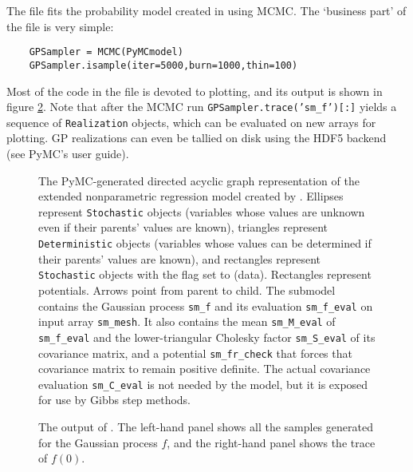The file  fits the probability model created in  using MCMC. The `business part' of the file is very simple:
\begin{verbatim}
    GPSampler = MCMC(PyMCmodel)
    GPSampler.isample(iter=5000,burn=1000,thin=100)
\end{verbatim}
Most of the code in the file is devoted to plotting, and its output is shown in figure \ref{fig:MCMCOutput}. Note that after the MCMC run \texttt{GPSampler.trace('sm_f')[:]} yields a sequence of \texttt{Realization} objects, which can be evaluated on new arrays for plotting. GP realizations can even be tallied on disk using the HDF5 backend (see PyMC's user guide).

\begin{figure}
    \centering
    \caption{The PyMC-generated directed acyclic graph representation of the extended nonparametric regression model created by . Ellipses represent \texttt{Stochastic} objects (variables whose values are unknown even if their parents' values are known), triangles represent \texttt{Deterministic} objects (variables whose values can be determined if their parents' values are known), and rectangles represent \texttt{Stochastic} objects with the  flag set to  (data). Rectangles represent potentials. Arrows point from parent to child. The submodel contains the Gaussian process \texttt{sm\_f} and its evaluation \texttt{sm\_f\_eval} on input array \texttt{sm\_mesh}. It also contains the mean \texttt{sm\_M\_eval} of \texttt{sm\_f\_eval} and the lower-triangular Cholesky factor \texttt{sm\_S\_eval} of its covariance matrix, and a potential \texttt{sm_fr_check} that forces that covariance matrix to remain positive definite. The actual covariance evaluation \texttt{sm\_C\_eval} is not needed by the model, but it is exposed for use by Gibbs step methods.}
    \label{fig:unobservedModel}
\end{figure}

\begin{figure}
    \centering
    \caption{The output of . The left-hand panel shows all the samples generated for the Gaussian process $f$, and the right-hand panel shows the trace of $f(0)$.}
    \label{fig:MCMCOutput}
\end{figure}






